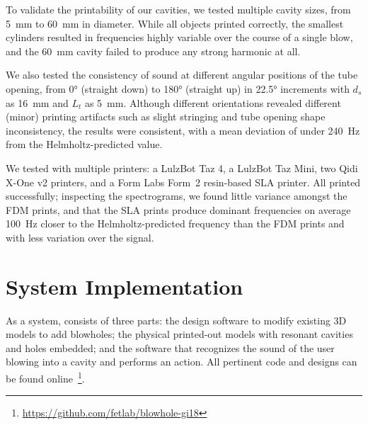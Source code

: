      To validate the printability of our cavities, we tested multiple cavity
      sizes, from 5~mm to 60~mm in diameter. While all objects printed
      correctly, the smallest cylinders resulted in frequencies highly variable
      over the course of a single blow, and the 60~mm cavity failed to produce
      any strong harmonic at all.
      
      We also tested the consistency of sound at different angular positions of
      the tube opening, from 0° (straight down) to 180° (straight up) in 22.5°
      increments with $d_s$ as 16~mm and $L_t$ as 5~mm.  Although different
      orientations revealed different (minor) printing artifacts such as slight
      stringing and tube opening shape inconsistency, the results were
      consistent, with a mean deviation of under 240~Hz from the
      Helmholtz-predicted value.
      
      We tested \bh with multiple printers: a LulzBot Taz 4, a LulzBot Taz Mini,
      two Qidi X-One v2 printers, and a Form Labs Form~2 resin-based SLA
      printer. All printed successfully; inspecting the spectrograms, we found
      little variance amongst the FDM prints, and that the SLA prints produce
      dominant frequencies on average 100~Hz closer to the Helmholtz-predicted
      frequency than the FDM prints and with less variation over the signal.

  \section{System Implementation}
    As a system, \bh consists of three parts: the design software to modify
    existing 3D models to add blowholes; the physical printed-out models with
    resonant cavities and holes embedded; and the software that recognizes the
    sound of the user blowing into a cavity and performs an action. All
    pertinent code and designs can be found
    online~\footnote{\url{https://github.com/fetlab/blowhole-gi18}}.
          
